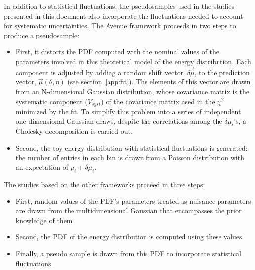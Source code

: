In addition to statistical fluctuations, the pseudosamples used in the studies  presented in this document also incorporate 
the fluctuations needed to account  for systematic uncertainties. The Avenue framework proceeds in two steps to produce a pseudosample:
\begin{itemize}
    \item First, it distorts the PDF computed with the nominal values of the parameters involved in this theoretical model of the energy distribution. Each component is adjusted by adding a random shift vector, $\vec{\delta \mu}$, to the prediction vector, $\vec{\mu}(\theta,\eta)$  (see section~\ref{app:fit}). The elements of this vector are drawn from an N-dimensional Gaussian distribution, whose covariance matrix is the systematic component ($V_{syst}$) of the covariance matrix used in the $\chi^2$ minimized by the fit. To simplify this problem into a series of independent one-dimensional Gaussian draws, despite the correlations among the  $\delta\mu_i$’s, a Cholesky decomposition is carried out.
    \item Second, the toy energy distribution with statistical fluctuations is generated: the number of entries in each bin is drawn from a Poisson distribution with an expectation of  $\mu_i+\delta \mu_i$.
\end{itemize}
The studies based on the other frameworks proceed in three steps:
\begin{itemize}
    \item First, random values of the PDF’s parameters treated as nuisance parameters are drawn from the multidimensional Gaussian that encompasses the prior knowledge of them. 
    \item Second, the PDF of the energy distribution is computed using these values.
    \item Finally, a pseudo sample is drawn from this PDF to incorporate statistical fluctuations.
\end{itemize}


